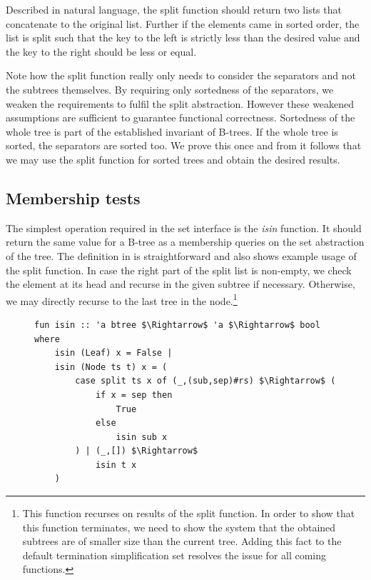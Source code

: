 Described in natural language, the split function should return two lists
that concatenate to the original list.
Further if the elements came in sorted order,
the list is split such that the key to the left is strictly
less than the desired value and the key to the right
should be less or equal.

Note how the split function really only needs to
consider the separators and not the subtrees themselves.
By requiring only sortedness of the separators,
we weaken the requirements to fulfil the split abstraction.
However these weakened assumptions are sufficient to guarantee
functional correctness.
Sortedness of the whole tree is part of the established invariant of B-trees.
If the whole tree is sorted, the separators are sorted too.
We prove this once and from it follows that
we may use the split function for sorted trees
and obtain the desired results.

\subsection{Membership tests}

The simplest operation required in the set interface is
the \textit{isin} function.
It should return the same value for a B-tree 
as a membership queries on the set abstraction of the tree.
The definition in  is straightforward 
and also shows example usage of the split function.
In case the right part of the split list is non-empty,
we check the element at its head and recurse in the given subtree
if necessary.
Otherwise, we may directly recurse to the last tree in the node.\footnote{
    This function recurses on results of the split function.
    In order to show that this function terminates, we need to show
    the system that the obtained subtrees are of smaller size than the current tree.
    Adding this fact to the default termination simplification set resolves
    the issue for all coming functions.
}

\begin{figure}
\begin{lstlisting}[mathescape=true, language=Isabelle, caption=The \textit{isin} function, label=lst:isin-fun]
fun isin :: 'a btree $\Rightarrow$ 'a $\Rightarrow$ bool where
    isin (Leaf) x = False |
    isin (Node ts t) x = (
        case split ts x of (_,(sub,sep)#rs) $\Rightarrow$ (
            if x = sep then
                True
            else
                isin sub x
        ) | (_,[]) $\Rightarrow$
            isin t x
    )
\end{lstlisting}
\end{figure}

